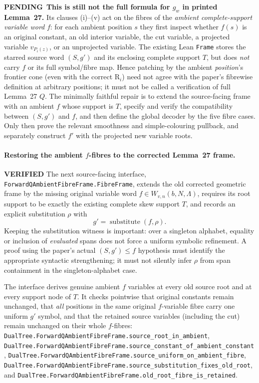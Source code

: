 \documentclass[11pt]{article}
\newcommand{\ok}{\textcolor{green!40!black}{\textbf{VERIFIED}}}
\newcommand{\todo}{\textcolor{gray!70!black}{\textbf{PENDING}}}
\newcommand{\lean}[1]{\texttt{#1}}
\begin{document}
\todo\ \textbf{This is still not the full formula for $g_w$ in
printed Lemma~27.} Its clauses (i)--(v) act on the fibres of the
\emph{ambient complete-support variable word} $f$: for each
ambient position $s$ they first inspect whether $f(s)$ is an
original constant, an old interior variable, the cut variable,
a projected variable $v_{P_i(z)}$, or an unprojected variable.
The existing Lean \texttt{Frame} stores the starred source word
$(S,g')$ and its enclosing complete support $T$, but does
\emph{not} carry $f$ or its full symbol/fibre map. Hence patching
by the ambient \emph{position}'s frontier cone (even with the
correct R$_i$) need not agree with the paper's fibrewise
definition at arbitrary positions; it must not be called a
verification of full Lemma~27 $Q$. The minimally faithful repair
is to extend the source-facing frame with an ambient $f$
whose support is $T$, specify and verify the compatibility
between $(S,g')$ and $f$, and then define the global decoder by
the five fibre cases. Only then prove the relevant smoothness
and simple-colouring pullback, and separately construct $f'$
with the projected new variable roots.


\paragraph{Restoring the ambient $f$-fibres to the corrected
Lemma~27 frame.} \ok
The next source-facing interface,
\texttt{ForwardQAmbientFibreFrame.FibreFrame}, extends the old
corrected geometric frame by the missing original variable word
$f\in W_{v,n}(b,N,\Lambda)$, requires its root support to be
exactly the existing complete skew support $T$, and records
an explicit substitution $\rho$ with
\[
   g'=\operatorname{substitute}(f,\rho).
\]
Keeping the substitution witness is important: over a
singleton alphabet, equality or inclusion of \emph{evaluated}
spans does not force a uniform symbolic refinement. A proof
using the paper's actual $(S,g')\leq f$ hypothesis must
identify the appropriate syntactic strengthening; it must
not silently infer $\rho$ from span containment in the
singleton-alphabet case.

The interface derives genuine ambient $f$ variables at every
old source root and at every support node of $T$. It checks
pointwise that original constants remain unchanged, that
\emph{all} positions in the same original $f$-variable fibre
carry one uniform $g'$ symbol, and that the retained source
variables (including the cut) remain unchanged on their
whole $f$-fibres:
\lean{DualTree.ForwardQAmbientFibreFrame.source_root_in_ambient},
\lean{DualTree.ForwardQAmbientFibreFrame.source_constant_of_ambient_constant},
\lean{DualTree.ForwardQAmbientFibreFrame.source_uniform_on_ambient_fibre},
\lean{DualTree.ForwardQAmbientFibreFrame.source_substitution_fixes_old_root},
and
\lean{DualTree.ForwardQAmbientFibreFrame.old_root_fibre_is_retained}.
\end{document}
